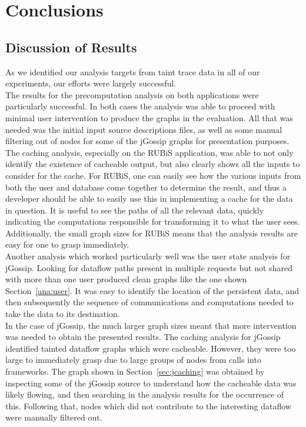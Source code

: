 \documentclass[msc,oneside]{ubcthesis}
\begin{document}
\chapter{Conclusions} %

\section{Discussion of Results}

As we identified our analysis targets from taint trace data in all of our experiments, our efforts were largely successful.\\

The results for the precomputation analysis on both applications were particularly successful. In both cases the analysis was able to proceed with minimal user intervention to produce the graphs in the evaluation. All that was needed was the initial input source descriptions files, as well as some manual filtering out of nodes for some of the jGossip graphs for presentation purposes.\\

The caching analysis, especially on the RUBiS application, was able to not only identify the existence of cacheable output, but also clearly shows all the inputs to consider for the cache. For RUBiS, one can easily see how the various inputs from both the user and database come together to determine the result, and thus a developer should be able to easily use this in implementing a cache for the data in question. It is useful to see the paths of all the relevant data, quickly indicating the computations responsible for transforming it to what the user sees. Additionally, the small graph sizes for RUBiS means that the analysis results are easy for one to grasp immediately. \\

Another analysis which worked particularly well was the user state analysis for jGossip. Looking for dataflow paths present in multiple requests but not shared with more than one user produced clean graphs like the one shown Section~\ref{ana:user}. It was easy to identify the location of the persistent data, and then subsequently the sequence of communications and computations needed to take the data to its destination.\\

In the case of jGossip, the much larger graph sizes meant that more intervention was needed to obtain the presented results. The caching analysis for jGossip identified tainted dataflow graphs which were cacheable. However, they were too large to immediately grasp due to large groups of nodes from calls into frameworks. The graph shown in Section~\ref{sec:jcaching} was obtained by inspecting some of the jGossip source to understand how the cacheable data was likely flowing, and then searching in the analysis results for the occurrence of this. Following that, nodes which did not contribute to the interesting dataflow were manually filtered out.\\
\end{document}
